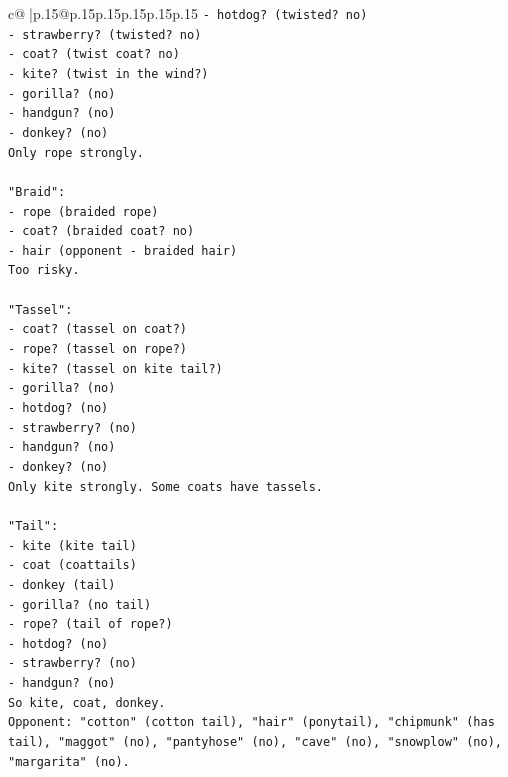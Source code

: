 \documentclass{article}
\begin{document}
{\begin{supertabular}{c@{$\;$}|p{.15\linewidth}@{}p{.15\linewidth}p{.15\linewidth}p{.15\linewidth}p{.15\linewidth}p{.15\linewidth}}
{{{\texttt{{-} hotdog? (twisted? no)} \\
\texttt{{-} strawberry? (twisted? no)} \\
\texttt{{-} coat? (twist coat? no)} \\
\texttt{{-} kite? (twist in the wind?)} \\
\texttt{{-} gorilla? (no)} \\
\texttt{{-} handgun? (no)} \\
\texttt{{-} donkey? (no)} \\
\texttt{Only rope strongly.} \\
\\ 
\texttt{"Braid":} \\
\texttt{{-} rope (braided rope)} \\
\texttt{{-} coat? (braided coat? no)} \\
\texttt{{-} hair (opponent {-} braided hair)} \\
\texttt{Too risky.} \\
\\ 
\texttt{"Tassel":} \\
\texttt{{-} coat? (tassel on coat?)} \\
\texttt{{-} rope? (tassel on rope?)} \\
\texttt{{-} kite? (tassel on kite tail?)} \\
\texttt{{-} gorilla? (no)} \\
\texttt{{-} hotdog? (no)} \\
\texttt{{-} strawberry? (no)} \\
\texttt{{-} handgun? (no)} \\
\texttt{{-} donkey? (no)} \\
\texttt{Only kite strongly. Some coats have tassels.} \\
\\ 
\texttt{"Tail":} \\
\texttt{{-} kite (kite tail)} \\
\texttt{{-} coat (coattails)} \\
\texttt{{-} donkey (tail)} \\
\texttt{{-} gorilla? (no tail)} \\
\texttt{{-} rope? (tail of rope?)} \\
\texttt{{-} hotdog? (no)} \\
\texttt{{-} strawberry? (no)} \\
\texttt{{-} handgun? (no)} \\
\texttt{So kite, coat, donkey.} \\
\texttt{Opponent: "cotton" (cotton tail), "hair" (ponytail), "chipmunk" (has tail), "maggot" (no), "pantyhose" (no), "cave" (no), "snowplow" (no), "margarita" (no).} \\
}}}
\end{supertabular}}
\end{document}
